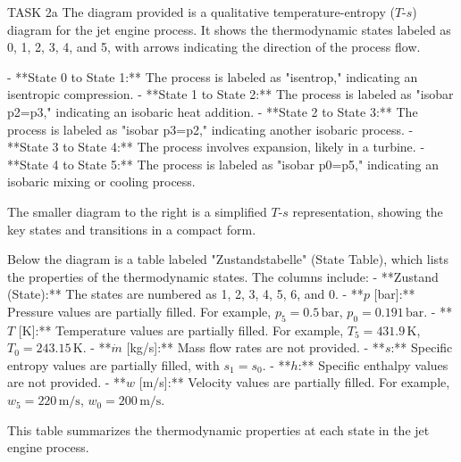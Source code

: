 TASK 2a  
The diagram provided is a qualitative temperature-entropy (\(T\)-\(s\)) diagram for the jet engine process. It shows the thermodynamic states labeled as 0, 1, 2, 3, 4, and 5, with arrows indicating the direction of the process flow.  

- **State 0 to State 1:** The process is labeled as "isentrop," indicating an isentropic compression.  
- **State 1 to State 2:** The process is labeled as "isobar p2=p3," indicating an isobaric heat addition.  
- **State 2 to State 3:** The process is labeled as "isobar p3=p2," indicating another isobaric process.  
- **State 3 to State 4:** The process involves expansion, likely in a turbine.  
- **State 4 to State 5:** The process is labeled as "isobar p0=p5," indicating an isobaric mixing or cooling process.  

The smaller diagram to the right is a simplified \(T\)-\(s\) representation, showing the key states and transitions in a compact form.  

Below the diagram is a table labeled "Zustandstabelle" (State Table), which lists the properties of the thermodynamic states. The columns include:  
- **Zustand (State):** The states are numbered as 1, 2, 3, 4, 5, 6, and 0.  
- **\(p\) [bar]:** Pressure values are partially filled. For example, \(p_5 = 0.5 \, \text{bar}\), \(p_0 = 0.191 \, \text{bar}\).  
- **\(T\) [K]:** Temperature values are partially filled. For example, \(T_5 = 431.9 \, \text{K}\), \(T_0 = 243.15 \, \text{K}\).  
- **\(\dot{m}\) [kg/s]:** Mass flow rates are not provided.  
- **\(s\):** Specific entropy values are partially filled, with \(s_1 = s_0\).  
- **\(h\):** Specific enthalpy values are not provided.  
- **\(w\) [m/s]:** Velocity values are partially filled. For example, \(w_5 = 220 \, \text{m/s}\), \(w_0 = 200 \, \text{m/s}\).  

This table summarizes the thermodynamic properties at each state in the jet engine process.